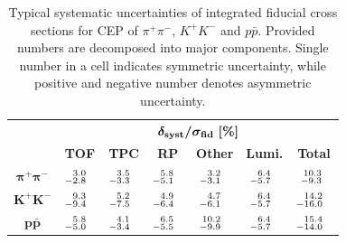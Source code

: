 {
\renewcommand{\arraystretch}{1.5}
\begin{table}[]\centering
\begin{tabular}{c ccccc|c}
 ~ & \multicolumn{6}{c}{  $\bm{ \delta_{\text{\bf{syst}}}/\sigma_{\text{\bf{fid}}}~[\text{\bf{\%}}]}$   } \\
 ~ & \bf{TOF} & \bf{TPC} & \bf{RP} & \bf{Other} & \bf{Lumi.} & \bf{Total} \\ \hline\hline
 $\bm{\pi^{+}\pi^{-}}$ & $\prescript{3.0}{-2.8}{~~}$ & $\prescript{3.5}{-3.3}{~~}$ & $\prescript{5.8}{-5.1}{~~}$ & $\prescript{3.2}{-3.1}{~~}$ & $\prescript{6.4}{-5.7}{~~}$ & $\prescript{~10.3}{~-9.3}{~~}$ \\ $\bm{K^{+}K^{-}}$ & $\prescript{9.3}{-9.4}{~~}$ & $\prescript{5.2}{-7.5}{~~}$ & $\prescript{4.9}{-6.4}{~~}$ & $\prescript{4.7}{-6.1}{~~}$ & $\prescript{6.4}{-5.7}{~~}$ & $\prescript{14.2}{-16.0}{~~}$ \\ $\bm{p\bar{p}}$ & $\prescript{5.8}{-5.0}{~~}$ & $\prescript{4.1}{-3.4}{~~}$ & $\prescript{6.5}{-5.5}{~~}$ & $\prescript{10.2}{-9.9}{~~}$ & $\prescript{6.4}{-5.7}{~~}$ & $\prescript{15.4}{-14.0}{~~}$ \\
\end{tabular}
\caption{Typical systematic uncertainties of integrated fiducial cross sections for CEP of $\pi^{+}\pi^{-}$, $K^{+}K^{-}$ and $p\bar{p}$. Provided numbers are decomposed into major components. Single number in a cell indicates symmetric uncertainty, while positive and negative number denotes asymmetric uncertainty.}\label{tab:xSecSyst}
\end{table}
}


